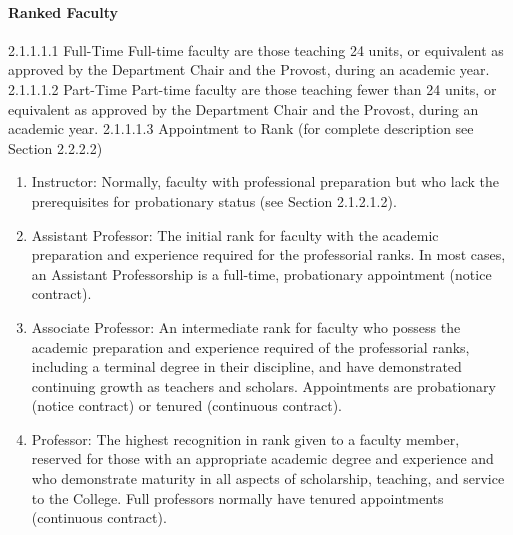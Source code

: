 \documentclass[letterpaper, 11pt]{article}
\begin{document}
			\paragraph{Ranked Faculty}
				2.1.1.1.1 Full-Time
				Full-time faculty are those teaching 24 units, or equivalent as approved by the Department Chair and the Provost, during an academic year.
				2.1.1.1.2 Part-Time
				Part-time faculty are those teaching fewer than 24 units, or equivalent as approved by the Department Chair and the Provost, during an academic year.
				2.1.1.1.3 Appointment to Rank
				(for complete description see Section 2.2.2.2)
				\begin{enumerate}[label=\alph*)]
					\item{Instructor:  Normally, faculty with professional preparation but who lack the prerequisites for probationary status (see Section 2.1.2.1.2).}
					\item{Assistant Professor:  The initial rank for faculty with the academic preparation and experience required for the professorial ranks. In most cases, an Assistant Professorship is a full-time, probationary appointment (notice contract).}
					\item{Associate Professor:  An intermediate rank for faculty who possess the academic preparation and experience required of the professorial ranks, including a terminal degree in their discipline, and have demonstrated continuing growth as teachers and scholars. Appointments are probationary (notice contract) or tenured (continuous contract).}
					\item{Professor:  The highest recognition in rank given to a faculty member, reserved for those with an appropriate academic degree and experience and who demonstrate maturity in all aspects of scholarship, teaching, and service to the College. Full professors normally have tenured appointments (continuous contract).}
				\end{enumerate}
\end{document}
